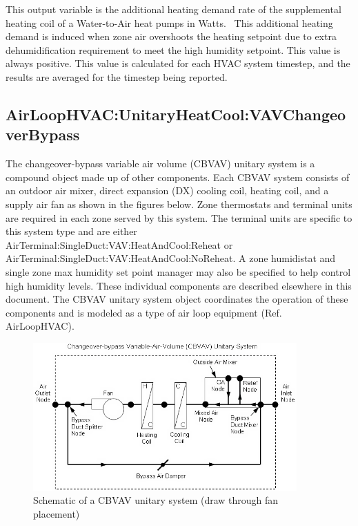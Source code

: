 This output variable is the additional heating demand rate of the supplemental heating coil of a Water-to-Air heat pumps in Watts.~ This additional heating demand is induced when zone air overshoots the heating setpoint due to extra dehumidification requirement to meet the high humidity setpoint. This value is always positive. This value is calculated for each HVAC system timestep, and the results are averaged for the timestep being reported.

\subsection{AirLoopHVAC:UnitaryHeatCool:VAVChangeoverBypass}\label{airloophvacunitaryheatcoolvavchangeoverbypass}

The changeover-bypass variable air volume (CBVAV) unitary system is a compound object made up of other components. Each CBVAV system consists of an outdoor air mixer, direct expansion (DX) cooling coil, heating coil, and a supply air fan as shown in the figures below. Zone thermostats and terminal units are required in each zone served by this system. The terminal units are specific to this system type and are either AirTerminal:SingleDuct:VAV:HeatAndCool:Reheat or AirTerminal:SingleDuct:VAV:HeatAndCool:NoReheat. A zone humidistat and single zone max humidity set point manager may also be specified to help control high humidity levels. These individual components are described elsewhere in this document. The CBVAV unitary system object coordinates the operation of these components and is modeled as a type of air loop equipment (Ref. AirLoopHVAC).

\begin{figure}[hbtp] %
\centering
\includegraphics[width=0.9\textwidth, height=0.9\textheight, keepaspectratio=true]{media/image308.png}
\caption{Schematic of a CBVAV unitary system (draw through fan placement) \protect \label{fig:schematic-of-a-cbvav-unitary-system-draw}}
\end{figure}

